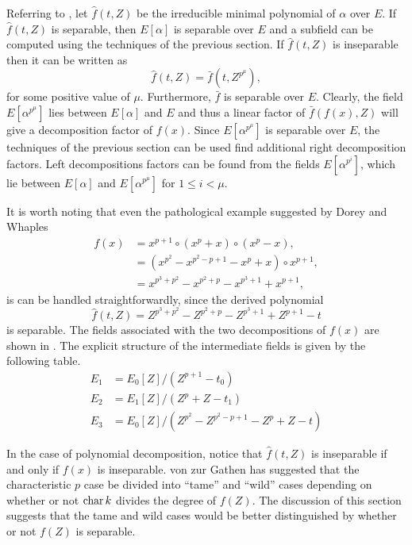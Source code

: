 Referring to , let $\hat{f}(t, Z)$ be
the irreducible minimal polynomial of $\alpha$ over $E$. If
$\hat{f}(t, Z)$ is separable, then $E[\alpha]$ is separable over $E$
and a subfield can be computed using the techniques of the previous
section.  If $\hat{f}(t, Z)$ is inseparable then it can be written as
\[
\hat{f}(t, Z) = \bar{f}(t, Z^{p^\mu}),
\]
for some positive value of $\mu$.  Furthermore, $\bar{f}$ is separable
over $E$. Clearly, the field $E[\alpha^{p^\mu}]$ lies between
$E[\alpha]$ and $E$ and thus a linear factor of $\bar{f}(f(x), Z)$
will give a decomposition factor of $f(x)$.  Since $E[\alpha^{p^\mu}]$
is separable over $E$, the techniques of the previous section can be
used find additional right decomposition factors.  Left decompositions
factors can be found from the fields $E[\alpha^{p^i}]$, which lie
between $E[\alpha]$ and $E[\alpha^{p^\mu}]$ for $1 \le i < \mu$.

It is worth noting that even the pathological example suggested by Dorey
and Whaples 
\[
\begin{aligned}
  f(x) & = x^{p+1} \circ (x^p + x) \circ (x^p - x), \\
       & = (x^{p^2} - x^{p^2-p+1} - x^p + x) \circ x^{p+1}, \\
       & = x^{p^3+p^2} - x^{p^2+p} - x^{p^3+1} + x^{p+1},
\end{aligned}
\]
is can be handled straightforwardly, since the derived polynomial 
\[
\hat{f}(t, Z) = 
Z^{p^3+p^2} - Z^{p^2+p} - Z^{p^3+1} + Z^{p+1} - t
\]
is separable.  The fields associated with the two decompositions of $f(x)$
are shown in .  The explicit structure of the
intermediate fields is given by the following table.
\[
\begin{aligned}
  E_1 &= E_0[Z]/(Z^{p+1} - t_0) \\
  E_2 &= E_1[Z]/(Z^p+Z -t_1) \\
  E_3 &= E_0[Z]/(Z^{p^2} - Z^{p^2-p+1}- Z^p+Z-t)
\end{aligned}
\]

In the case of polynomial decomposition, notice that $\hat{f}(t, Z)$
is inseparable if and only if $f(x)$ is inseparable.  von zur Gathen
\cite{Von_zur_Gathen1990-wd} has suggested that the characteristic $p$
case be divided into ``tame'' and ``wild'' cases depending on whether
or not $\mathop{\rm char}\nolimits k$ divides the degree of $f(Z)$.  The discussion of this
section suggests that the tame and wild cases would be better
distinguished by whether or not $f(Z)$ is separable.

